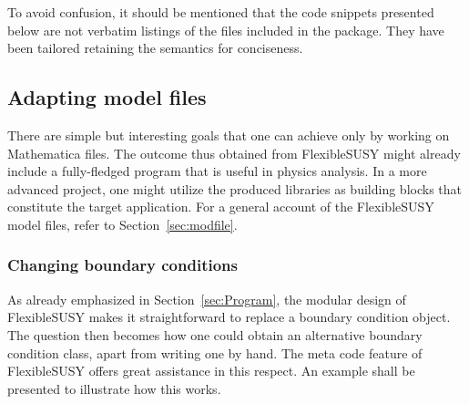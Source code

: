 \documentclass[final,3p,11pt,pdflatex]{elsarticle}
\makeatletter
\newcommand{\fs}{FlexibleSUSY\@\xspace}
\newcommand{\mathematica}{Mathematica\xspace}
\newcommand{\secref}[1]{Section~\ref{#1}}
\makeatother
\begin{document}
To avoid confusion,
it should be mentioned that
the code snippets presented below are not
verbatim listings of the files included in the package.
They have been tailored retaining the semantics
for conciseness.

\subsection{Adapting model files}
\label{sec:adapting-model-files}

There are simple but interesting goals
that one can achieve only by working on
\mathematica files.
The outcome thus obtained from \fs
might already include a fully-fledged program
that is useful in physics analysis.
In a more advanced project,
one might utilize the produced libraries as building blocks
that constitute the target application.
For a general account of the \fs model files,
refer to \secref{sec:modfile}.

\subsubsection{Changing boundary conditions}
\label{sec:changing boundary conditions}

As already emphasized in \secref{sec:Program}, the modular design of
\fs makes it straightforward %
to replace a boundary condition object.
The question then becomes how
one could obtain an alternative boundary condition class,
apart from writing one by hand.
The meta code feature of \fs offers great assistance
in this respect.
An example shall be presented to illustrate how this works.
\end{document}
